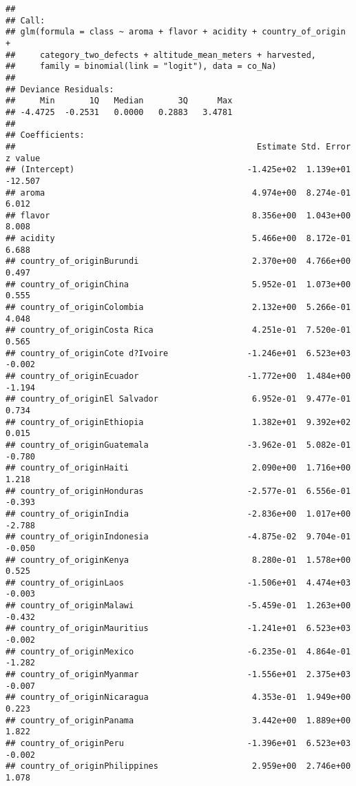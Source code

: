 \documentclass[
]{article}
\begin{document}
\begin{verbatim}
## 
## Call:
## glm(formula = class ~ aroma + flavor + acidity + country_of_origin + 
##     category_two_defects + altitude_mean_meters + harvested, 
##     family = binomial(link = "logit"), data = co_Na)
## 
## Deviance Residuals: 
##     Min       1Q   Median       3Q      Max  
## -4.4725  -0.2531   0.0000   0.2883   3.4781  
## 
## Coefficients:
##                                                 Estimate Std. Error z value
## (Intercept)                                   -1.425e+02  1.139e+01 -12.507
## aroma                                          4.974e+00  8.274e-01   6.012
## flavor                                         8.356e+00  1.043e+00   8.008
## acidity                                        5.466e+00  8.172e-01   6.688
## country_of_originBurundi                       2.370e+00  4.766e+00   0.497
## country_of_originChina                         5.952e-01  1.073e+00   0.555
## country_of_originColombia                      2.132e+00  5.266e-01   4.048
## country_of_originCosta Rica                    4.251e-01  7.520e-01   0.565
## country_of_originCote d?Ivoire                -1.246e+01  6.523e+03  -0.002
## country_of_originEcuador                      -1.772e+00  1.484e+00  -1.194
## country_of_originEl Salvador                   6.952e-01  9.477e-01   0.734
## country_of_originEthiopia                      1.382e+01  9.392e+02   0.015
## country_of_originGuatemala                    -3.962e-01  5.082e-01  -0.780
## country_of_originHaiti                         2.090e+00  1.716e+00   1.218
## country_of_originHonduras                     -2.577e-01  6.556e-01  -0.393
## country_of_originIndia                        -2.836e+00  1.017e+00  -2.788
## country_of_originIndonesia                    -4.875e-02  9.704e-01  -0.050
## country_of_originKenya                         8.280e-01  1.578e+00   0.525
## country_of_originLaos                         -1.506e+01  4.474e+03  -0.003
## country_of_originMalawi                       -5.459e-01  1.263e+00  -0.432
## country_of_originMauritius                    -1.241e+01  6.523e+03  -0.002
## country_of_originMexico                       -6.235e-01  4.864e-01  -1.282
## country_of_originMyanmar                      -1.556e+01  2.375e+03  -0.007
## country_of_originNicaragua                     4.353e-01  1.949e+00   0.223
## country_of_originPanama                        3.442e+00  1.889e+00   1.822
## country_of_originPeru                         -1.396e+01  6.523e+03  -0.002
## country_of_originPhilippines                   2.959e+00  2.746e+00   1.078

\end{verbatim}
\end{document}
